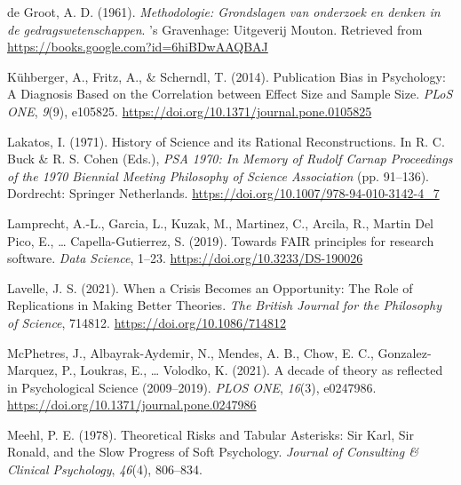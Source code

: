 \documentclass[
  man]{apa6}
\newlength{\cslhangindent}
\newenvironment{CSLReferences}[2] %
 {\begin{list}{}{%
  \setlength{\itemindent}{0pt}
  \setlength{\leftmargin}{0pt}
  \setlength{\parsep}{0pt}
  \ifodd #1
   \setlength{\leftmargin}{\cslhangindent}
   \setlength{\itemindent}{-1\cslhangindent}
  \fi
  \setlength{\itemsep}{#2\baselineskip}}}
 {\end{list}}
\begin{document}
\label{refs}
\begin{CSLReferences}{1}{0}
de Groot, A. D. (1961). \emph{Methodologie: Grondslagen van onderzoek en denken in de gedragswetenschappen}. 's Gravenhage: Uitgeverij Mouton. Retrieved from \url{https://books.google.com?id=6hiBDwAAQBAJ}

Kühberger, A., Fritz, A., \& Scherndl, T. (2014). Publication {Bias} in {Psychology}: {A Diagnosis Based} on the {Correlation} between {Effect Size} and {Sample Size}. \emph{PLoS ONE}, \emph{9}(9), e105825. \url{https://doi.org/10.1371/journal.pone.0105825}

Lakatos, I. (1971). History of {Science} and its {Rational Reconstructions}. In R. C. Buck \& R. S. Cohen (Eds.), \emph{{PSA} 1970: {In Memory} of {Rudolf Carnap Proceedings} of the 1970 {Biennial Meeting Philosophy} of {Science Association}} (pp. 91--136). Dordrecht: Springer Netherlands. \url{https://doi.org/10.1007/978-94-010-3142-4_7}

Lamprecht, A.-L., Garcia, L., Kuzak, M., Martinez, C., Arcila, R., Martin Del Pico, E., \ldots{} Capella-Gutierrez, S. (2019). Towards {FAIR} principles for research software. \emph{Data Science}, 1--23. \url{https://doi.org/10.3233/DS-190026}

Lavelle, J. S. (2021). When a {Crisis Becomes} an {Opportunity}: {The Role} of {Replications} in {Making Better Theories}. \emph{The British Journal for the Philosophy of Science}, 714812. \url{https://doi.org/10.1086/714812}

McPhetres, J., Albayrak-Aydemir, N., Mendes, A. B., Chow, E. C., Gonzalez-Marquez, P., Loukras, E., \ldots{} Volodko, K. (2021). A decade of theory as reflected in {Psychological Science} (2009--2019). \emph{PLOS ONE}, \emph{16}(3), e0247986. \url{https://doi.org/10.1371/journal.pone.0247986}

Meehl, P. E. (1978). Theoretical {Risks} and {Tabular Asterisks}: {Sir Karl}, {Sir Ronald}, and the {Slow Progress} of {Soft Psychology}. \emph{Journal of Consulting \& Clinical Psychology}, \emph{46}(4), 806--834.


\end{CSLReferences}
\end{document}
